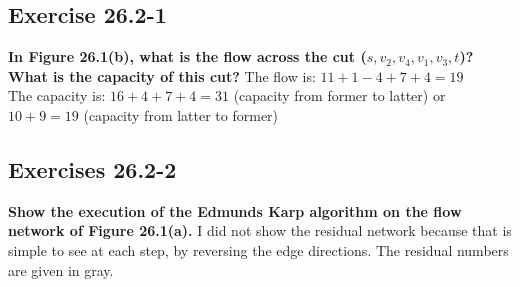 \documentclass[10pt,fullpage]{article}
\begin{document}
\subsection*{Exercise 26.2-1}
\textbf{In Figure 26.1(b), what is the flow across the cut (${s,
v_2, v_4}, {v_1, v_3, t}$)? What is the capacity of this cut?}
The flow is: $11+1-4+7+4 = 19$\\
The capacity is: $16+4+7+4 = 31$ (capacity from former to latter) or $10 + 9 = 19$ (capacity from latter to former)\\
\newpage
\subsection*{Exercises 26.2-2}
\textbf{Show the execution of the Edmunds Karp algorithm on the flow
network of Figure 26.1(a).} I did not show the residual network
because that is simple to see at each step, by reversing the edge
directions. The residual numbers
are given in gray.\\
\end{document}
